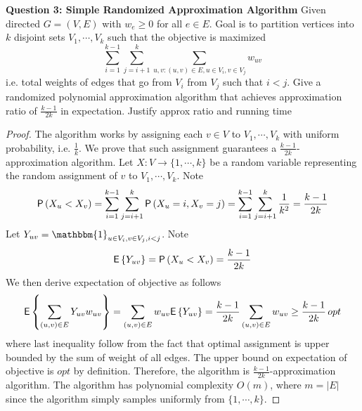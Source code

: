 \documentclass[11pt]{article}
\begin{document}
$ $\\
\textbf{Question 3: Simple Randomized Approximation Algorithm} Given directed $G=(V,E)$ with $w_e \geq 0$ for all $e\in E$. Goal is to partition vertices into $k$ disjoint sets $V_1,\cdots, V_k$ such that the objective is maximized 
\[
    \sum_{i=1}^{k-1} \sum_{j=i+1}^k  \sum_{u,v: (u,v)\in E,u\in V_i, v\in V_j} w_{uv}    
\]
i.e. total weights of edges that go from $V_i$ from $V_j$ such that $i<j$. Give a randomized polynomial approximation algorithm that achieves approximation ratio of $\textstyle\frac{k-1}{2k}$ in expectation. Justify approx ratio and running time 


\begin{proof}
    The algorithm works by assigning each $v\in V$ to $V_1,\cdots, V_k$ with uniform probability, i.e. $\textstyle\frac{1}{k}$. We prove that such assignment guarantees a $\textstyle\frac{k-1}{2k}$-approximation algorithm. Let $X:V\rightarrow \{1,\cdots, k\}$ be a random variable representing the random assignment of $v$ to $V_1,\cdots ,V_k$. Note 
    \[
        \P{X_u < X_v} = \sum_{i=1}^{k-1}\sum_{j=i+1}^k \P{X_u=i,X_v=j} =\sum_{i=1}^{k-1}\sum_{j=i+1}^k \frac{1}{k^2} = \frac{k-1}{2k}    
    \]
    Let $Y_{uv} = \mathbbm{1}_{u\in V_i, v\in V_j, i < j}$. Note 
    \[  
        \E{Y_{uv}} = \P{X_u < X_v} = \frac{k-1}{2k}  
    \]
    We then derive expectation of objective as follows 
    \begin{align*}
        \E{\sum_{(u,v)\in E} Y_{uv}w_{uv}}
        = \sum_{(u,v)\in E} w_{uv} \E{Y_{uv}}
        = \frac{k-1}{2k} \sum_{(u,v)\in E} w_{uv} 
        \geq \frac{k-1}{2k} \, opt
    \end{align*}
    where last inequality follow from the fact that optimal assignment is upper bounded by the sum of weight of all edges. The upper bound on expectation of objective is $opt$ by definition. Therefore, the algorithm is $\textstyle \frac{k-1}{2k}$-approximation algorithm. The algorithm has polynomial complexity $O(m)$, where $m=|E|$ since the algorithm simply samples uniformly from $\{ 1,\cdots, k\}$. 
\end{proof}
\end{document}

